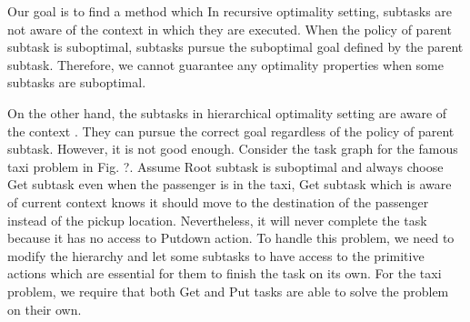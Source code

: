 Our goal is to find a method which 
In recursive optimality setting, subtasks are not aware of the context in which they are executed.
When the policy of parent subtask is suboptimal, subtasks pursue the suboptimal goal defined by the parent subtask.
Therefore, we cannot guarantee any optimality properties when some subtasks are suboptimal.

On the other hand, the subtasks in hierarchical optimality setting are aware of the context . 
They can pursue the correct goal regardless of the policy of parent subtask.
However, it is not good enough. Consider the task graph for the famous taxi problem in Fig. ?.  
Assume Root subtask is suboptimal and always choose Get subtask even when 
the passenger is in the taxi, Get subtask which is aware of current context knows
it should move to the destination of the passenger instead of the pickup location.
Nevertheless, it will never complete the task because it has no access to Putdown 
action. To handle this problem, we need to modify the hierarchy and let some subtasks 
to have access to the primitive actions which are essential for them to finish
the task on its own. For the taxi problem, we require that both Get and Put tasks
are able to solve the problem on their own.


